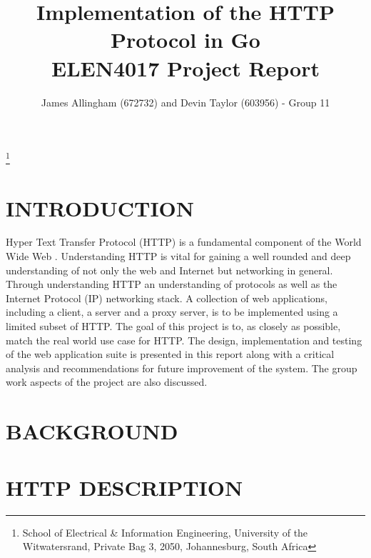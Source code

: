 \documentclass[10pt,twocolumn]{witseiepaper}
\begin{document}
\title{Implementation of the HTTP Protocol in Go \\ ELEN4017 Project Report}

\author{James Allingham (672732) and Devin Taylor (603956) - Group 11}
\thanks{School of Electrical \& Information Engineering, University of the
Witwatersrand, Private Bag 3, 2050, Johannesburg, South Africa}



\abstract{}



\maketitle

\section{INTRODUCTION} \label{intro}

Hyper Text Transfer Protocol (HTTP) is a fundamental component of the World Wide Web \cite{kurose}. Understanding HTTP is vital for gaining a well rounded and deep understanding of not only the web and Internet but networking in general. Through understanding HTTP an understanding of protocols as well as the Internet Protocol (IP) networking stack. A collection of web applications, including a client, a server and a proxy server, is to be implemented using a limited subset of HTTP. The goal of this project is to, as closely as possible, match the real world use case for HTTP. The design, implementation and testing of the web application suite is presented in this report along with a critical analysis and recommendations for future improvement of the system. The group work aspects of the project are also discussed. 

\section{BACKGROUND}

\section{HTTP DESCRIPTION}
\end{document}
